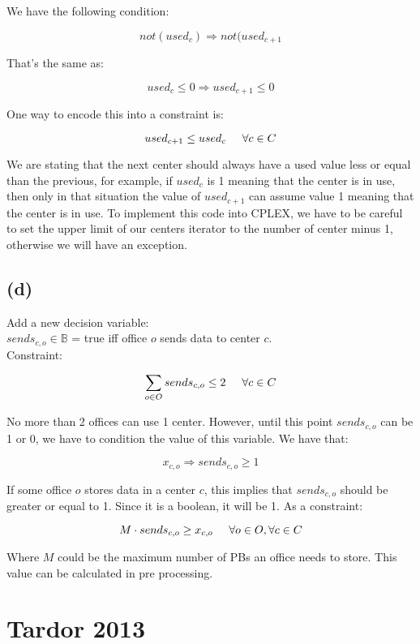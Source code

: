 \documentclass[11pt, oneside]{article}   	%
\begin{document}
We have the following condition:

$$not(used_c) \Longrightarrow not(used_{c+1}$$

That's the same as:

$$used_c \leq 0 \Longrightarrow used_{c+1} \leq 0$$

One way to encode this into a constraint is:

$$used_{c+1} \leq used_{c} \hspace{5 mm} \forall c \in C$$

We are stating that the next center should always have a used value less or equal than the previous, for example, if $used_c$ is 1 meaning that the center is in use, then only in that situation the value of $used_{c+1}$ can assume value 1 meaning that the center is in use. To implement this code into CPLEX, we have to be careful to set the upper limit of our centers iterator to the number of center minus 1, otherwise we will have an exception.

\subsection{(d)}
Add a new decision variable:\\

$sends_{c,o} \in \mathbb{B}$ = true iff office $o$ sends data to center $c$.\\

Constraint:

$$\sum_{o \in O} sends_{c,o} \leq 2 \hspace{5 mm} \forall c \in C$$

No more than 2 offices can use 1 center. However, until this point $sends_{c,o}$ can be 1 or 0, we have to condition the value of this variable. We have that:

$$x_{c,o} \Longrightarrow sends_{c,o} \geq 1$$

If some office $o$ stores data in a center $c$, this implies that $sends_{c,o}$ should be greater or equal to 1. Since it is a boolean, it will be 1. As a constraint:

$$M \cdot sends_{c,o} \geq x_{c,o} \hspace{5 mm} \forall o \in O, \forall c \in C$$

Where $M$ could be the maximum number of PBs an office needs to store. This value can be calculated in pre processing.

\section{Tardor 2013}
\end{document}
